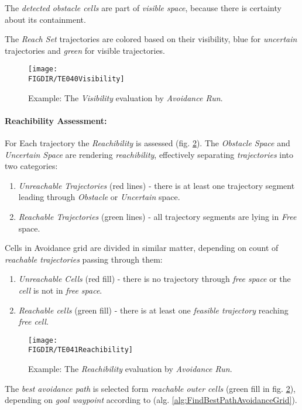  \begin{note}
     The \emph{detected obstacle cells} are part of \emph{visible space}, because there is certainty about its containment.
 \end{note}
 
\noindent The \emph{Reach Set} trajectories are colored based on their visibility, blue for \emph{uncertain} trajectories and \emph{green} for visible trajectories.

\begin{figure}[H]
    \centering
    \texttt{[image: \\FIGDIR/TE040Visibility]}        
    \caption{Example: The \emph{Visibility} evaluation by \emph{Avoidance Run}.}
    \label{fig:exampleVisibilityEvaluation}
\end{figure}

\paragraph{Reachibility Assessment:} For Each trajectory the \emph{Reachibility} is assessed (fig. \ref{fig:exampleReachibilityEvaluation}). The \emph{Obstacle Space} and \emph{Uncertain Space} are rendering \emph{reachibility}, effectively separating \emph{trajectories} into two categories:

\begin{enumerate}
    \item \emph{Unreachable Trajectories} (red lines) - there is at least one trajectory segment leading through \emph{Obstacle} or \emph{Uncertain} space.
    
    \item \emph{Reachable Trajectories} (green lines) -  all trajectory segments are lying in \emph{Free} space.
\end{enumerate}

\newpage\noindent Cells in Avoidance grid are divided in similar matter, depending on count of \emph{reachable trajectories} passing through them:

\begin{enumerate}
    \item \emph{Unreachable Cells} (red fill) - there is no trajectory through \emph{free space} or the \emph{cell} is not in \emph{free space}.
    
    \item \emph{Reachable cells} (green fill) - there is at least one \emph{feasible trajectory} reaching \emph{free cell}.
\end{enumerate}

\begin{figure}[H]
    \centering
    \texttt{[image: \\FIGDIR/TE041Reachibility]}        
    \caption{Example: The \emph{Reachibility} evaluation by \emph{Avoidance Run}.}
    \label{fig:exampleReachibilityEvaluation}
\end{figure}

\begin{note}
    The \emph{best avoidance path} is selected form \emph{reachable outer cells} (green fill in fig. \ref{fig:exampleReachibilityEvaluation}), depending on \emph{goal waypoint} according to (alg. \ref{alg:FindBestPathAvoidanceGrid}).
\end{note}
